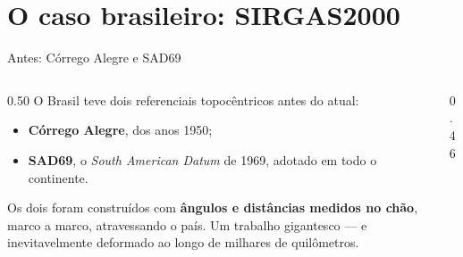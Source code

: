 \documentclass[aspectratio=169,11pt]{beamer}
\newcommand{\bnum}[1]{\textbf{\textcolor{mTeal}{#1}}}
\begin{document}
\section{O caso brasileiro: SIRGAS2000}

\begin{frame}{Antes: Córrego Alegre e SAD69}
  \begin{columns}[T]
    \begin{column}{0.50\textwidth}
      O Brasil teve dois referenciais topocêntricos antes do atual:
      \medskip
      \begin{itemize}
        \item \textbf{Córrego Alegre}, dos anos 1950;
        \item \textbf{SAD69}, o \emph{South American Datum} de 1969, adotado em todo o
              continente.
      \end{itemize}
      \medskip
      Os dois foram construídos com \bnum{ângulos e distâncias medidos no chão}, marco a
      marco, atravessando o país. Um trabalho gigantesco --- e inevitavelmente deformado ao
      longo de milhares de quilômetros.
    \end{column}
    \begin{column}{0.46\textwidth}
      \centering
    \end{column}
  \end{columns}
\end{frame}
\end{document}
